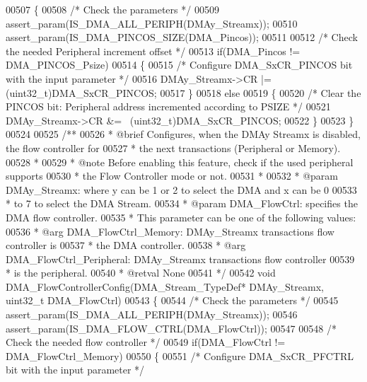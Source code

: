 \begin{DoxyCode}
00507 \{
00508   \textcolor{comment}{/* Check the parameters */}
00509   assert_param(IS\_DMA\_ALL\_PERIPH(DMAy\_Streamx));
00510   assert_param(IS\_DMA\_PINCOS\_SIZE(DMA\_Pincos));
00511 
00512   \textcolor{comment}{/* Check the needed Peripheral increment offset */}
00513   \textcolor{keywordflow}{if}(DMA\_Pincos != DMA_PINCOS_Psize)
00514   \{
00515     \textcolor{comment}{/* Configure DMA\_SxCR\_PINCOS bit with the input parameter */}
00516     DMAy\_Streamx->CR |= (uint32\_t)DMA_SxCR_PINCOS;
00517   \}
00518   \textcolor{keywordflow}{else}
00519   \{
00520     \textcolor{comment}{/* Clear the PINCOS bit: Peripheral address incremented according to PSIZE */}
00521     DMAy\_Streamx->CR &= ~(uint32\_t)DMA_SxCR_PINCOS;
00522   \}
00523 \}
00524 
00525 \textcolor{comment}{/**}
00526 \textcolor{comment}{  * @brief  Configures, when the DMAy Streamx is disabled, the flow controller for}
00527 \textcolor{comment}{  *         the next transactions (Peripheral or Memory).}
00528 \textcolor{comment}{  *       }
00529 \textcolor{comment}{  * @note   Before enabling this feature, check if the used peripheral supports }
00530 \textcolor{comment}{  *         the Flow Controller mode or not.    }
00531 \textcolor{comment}{  *  }
00532 \textcolor{comment}{  * @param  DMAy\_Streamx: where y can be 1 or 2 to select the DMA and x can be 0}
00533 \textcolor{comment}{  *          to 7 to select the DMA Stream.}
00534 \textcolor{comment}{  * @param  DMA\_FlowCtrl: specifies the DMA flow controller.}
00535 \textcolor{comment}{  *          This parameter can be one of the following values:}
00536 \textcolor{comment}{  *            @arg DMA\_FlowCtrl\_Memory: DMAy\_Streamx transactions flow controller is }
00537 \textcolor{comment}{  *                                      the DMA controller.}
00538 \textcolor{comment}{  *            @arg DMA\_FlowCtrl\_Peripheral: DMAy\_Streamx transactions flow controller }
00539 \textcolor{comment}{  *                                          is the peripheral.    }
00540 \textcolor{comment}{  * @retval None}
00541 \textcolor{comment}{  */}
00542 \textcolor{keywordtype}{void} DMA_FlowControllerConfig(DMA\_Stream\_TypeDef* DMAy\_Streamx, uint32\_t DMA\_FlowCtrl)
00543 \{
00544   \textcolor{comment}{/* Check the parameters */}
00545   assert_param(IS\_DMA\_ALL\_PERIPH(DMAy\_Streamx));
00546   assert_param(IS\_DMA\_FLOW\_CTRL(DMA\_FlowCtrl));
00547 
00548   \textcolor{comment}{/* Check the needed flow controller  */}
00549   \textcolor{keywordflow}{if}(DMA\_FlowCtrl != DMA_FlowCtrl_Memory)
00550   \{
00551     \textcolor{comment}{/* Configure DMA\_SxCR\_PFCTRL bit with the input parameter */}

\end{DoxyCode}
